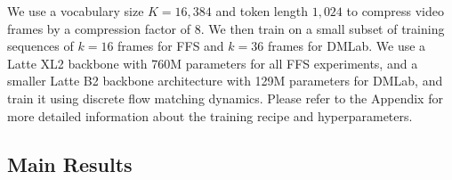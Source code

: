 We use a vocabulary size $K=16{,}384$ and token length $1{,}024$ to compress video frames by a compression factor of $8$. We then train on a small subset of training sequences of $k=16$ frames for FFS and $k=36$ frames for DMLab. We use a Latte XL2 \cite{ma2024latte} backbone with 760M parameters for all FFS experiments, and a smaller Latte B2 backbone architecture with 129M parameters for DMLab, and train it using discrete flow matching dynamics. Please refer to the Appendix for more detailed information about the training recipe and hyperparameters.


\subsection{Main Results}

\begin{table}[ht!]
    \centering
    \normalsize
\end{table}
